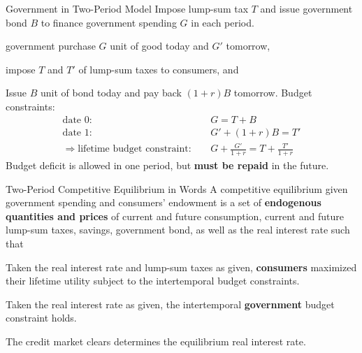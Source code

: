 \documentclass[11pt,aspectratio=169,usenames,dvipsnames]{beamer}
\let\tempone\itemize
\let\temptwo\enditemize
\renewenvironment{itemize}{\tempone\addtolength{\itemsep}{\fill}}{\temptwo}
\let\tempa\enumerate
\let\tempb\endenumerate
\renewenvironment{enumerate}{\tempa\addtolength{\itemsep}{\fill}}{\tempb}
\begin{document}
\begin{frame}{Government in Two-Period Model}
\label{slide:Government_in_Two_Period_Model}
    Impose \alert{lump-sum tax} $ T $ and issue \alert{government bond} $ B $ to finance \alert{government spending} $ G $ in each period.
    \begin{itemize}
        \item government purchase $ G $ unit of good today and $ G' $ tomorrow,
        \item impose $ T $ and $ T' $ of lump-sum taxes to consumers, and
        \item Issue $ B $ unit of bond today and pay back $ ( 1+r ) B $ tomorrow.
    \end{itemize}
    Budget constraints:
    \begin{align}
        \text{date 0}: \quad
            & G = T + B
        \\
        \text{date 1}: \quad
            & G' + ( 1+r ) B = T'
        \\
        \Rightarrow \text{lifetime budget constraint}: \quad
            & G + \frac{G'}{1+r} = T + \frac{T'}{1+r}
    \end{align}
    Budget deficit is allowed in one period, but \textbf{must be repaid} in the future.
\end{frame}

\begin{frame}{Two-Period Competitive Equilibrium in Words}
\label{slide:Two_Period_Competitive_Equilibrium_in_Words}
A competitive equilibrium given \alert{government spending} and \alert{consumers' endowment} is a set of \textbf{endogenous quantities and prices} of \alert{current and future consumption}, \alert{current and future lump-sum taxes}, \alert{savings}, \alert{government bond}, as well as the \alert{real interest rate} such that
\begin{enumerate}
    \item Taken the real interest rate and lump-sum taxes as given, \textbf{consumers} maximized their lifetime utility subject to the intertemporal budget constraints.
    \item Taken the real interest rate as given, the intertemporal \textbf{government} budget constraint holds.
    \item The credit market clears determines the equilibrium real interest rate.
\end{enumerate}
\end{frame}
\end{document}
